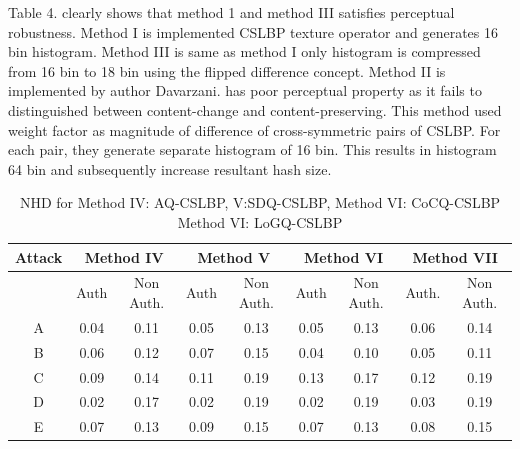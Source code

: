 \documentclass[12pt,a4paper]{jihmsp}
\begin{document}
{{Table 4. clearly shows that method 1 and method III satisfies perceptual robustness. Method I is implemented CSLBP texture operator and generates 16 bin histogram. Method III is same as method I only histogram is compressed from 16 bin to 18 bin using the flipped difference concept. Method II is implemented by author Davarzani\cite{davarzani2015}. has poor perceptual property as it fails to distinguished between content-change and content-preserving. This method used weight factor as magnitude of difference of cross-symmetric pairs of CSLBP. For each pair, they generate separate histogram of 16 bin. This results in histogram 64 bin and subsequently increase resultant hash size. \\


\begin{table} [h]
	\centering
	
	
	
	\caption{NHD for Method IV: AQ-CSLBP,  V:SDQ-CSLBP, Method VI: CoCQ-CSLBP Method VI: LoGQ-CSLBP}	
	\begin{tabular}{*9c}
		
		\toprule
		
		Attack
		
		& \multicolumn{2}{c}{  Method IV} 
		& \multicolumn{2}{c}{  Method V}
		& \multicolumn{2}{c}{  Method VI}
		& \multicolumn{2}{c}{  Method VII}
		
		
		
		\\
		\midrule
		
		{}   & Auth  & Non  Auth.  & Auth  &  Non  Auth.  &  Auth  & Non Auth.  & Auth.  & Non Auth. \\
		
		A  & 0.04	 & 0.11	 & 0.05	 & 0.13	 & 0.05	 & 0.13   & 0.06 & 0.14 \\	
		
		B  & 0.06   & 0.12  & 0.07  & 0.15  & 0.04  & 0.10   & 0.05 & 0.11 \\	
		
		C  & 0.09	 & 0.14	 & 0.11	 & 0.19	 & 0.13	 & 0.17   & 0.12 & 0.19 \\	
		
		D  & 0.02	 & 0.17	 & 0.02	 & 0.19	 & 0.02	 & 0.19   & 0.03 & 0.19 \\	
		
		E  & 0.07	 & 0.13	 & 0.09	 & 0.15	 & 0.07	 & 0.13   & 0.08 & 0.15 \\	
		

\end{tabular}
\end{table}}}
\end{document}

